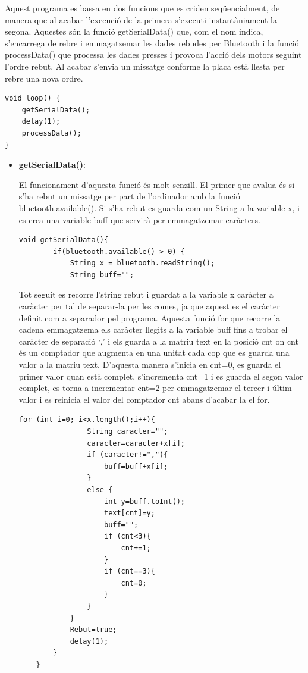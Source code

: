 Aquest programa es bassa en dos funcions que es criden seqüencialment, de manera que al acabar l’execució de la primera s’executi instantàniament la segona. Aquestes són la funció getSerialData() que, com el nom indica, s’encarrega de rebre i emmagatzemar les dades rebudes per Bluetooth i la funció processData() que processa les dades presses i provoca l’acció dels motors seguint l’ordre rebut. Al acabar s’envia un missatge conforme la placa està llesta per rebre una nova ordre. 
\begin{lstlisting}[style=Arduino]
void loop() {
	getSerialData();
	delay(1);
	processData();
}
\end{lstlisting}
\begin{itemize}
	\item \textbf{getSerialData()}:
	
	El funcionament d’aquesta funció és molt senzill. El primer que avalua és si s’ha rebut un missatge per part de l’ordinador amb la funció bluetooth.available(). Si s’ha rebut es guarda com un String a la variable x, i es crea una variable buff que servirà per emmagatzemar caràcters. 
	
	\begin{lstlisting}[style=Arduino]
	void getSerialData(){
		if(bluetooth.available() > 0) {
			String x = bluetooth.readString();
			String buff="";
	\end{lstlisting}
	
	Tot seguit es recorre l’string rebut i guardat a la variable x caràcter a caràcter per tal de separar-la per les comes, ja que aquest es el caràcter definit com a separador pel programa. Aquesta funció for que recorre la cadena emmagatzema els caràcter llegits a la variable buff fins a trobar el caràcter de separació ‘,’ i els guarda a la matriu text en la posició cnt on cnt és un comptador que augmenta en una unitat cada cop que es guarda una valor a la matriu text. D’aquesta manera s’inicia en cnt=0, es guarda el primer valor quan està complet, s’incrementa cnt=1 i es guarda el segon valor complet, es torna a incrementar cnt=2 per emmagatzemar el tercer i últim valor i es reinicia el valor del comptador cnt abans d’acabar la el for. 
	
	\begin{lstlisting}[style=Arduino]
			for (int i=0; i<x.length();i++){
				String caracter="";
				caracter=caracter+x[i];
				if (caracter!=","){
					buff=buff+x[i];
				}
				else {
					int y=buff.toInt();
					text[cnt]=y;
					buff="";
					if (cnt<3){
						cnt+=1;
					}
					if (cnt==3){
						cnt=0;
					}
				}
			}
			Rebut=true;
			delay(1);    
		}
	}
	\end{lstlisting}
	

\end{itemize}
